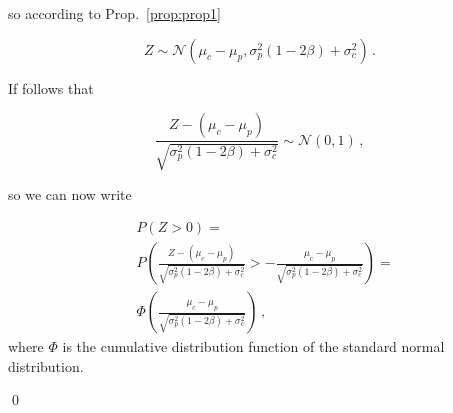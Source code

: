 \documentclass[final,10pt,5p,twocolumn,authoryear]{elsarticle}
\newcommand{\pref}[1]{Prop.~\ref{prop:#1}}
\newcommand{\be}{\begin{equation}}
\newcommand{\ee}{\end{equation}}
\numberwithin{equation}{section}
\begin{document}
so according to \pref{prop1}

\be
Z \sim \mathcal{N}\left(\mu_c - \mu_p,\sigma_p^2\left(1-2\beta\right) + \sigma_c^2\right)\,.
\ee

If follows that

\be
\frac{Z - \left(\mu_c - \mu_p\right)}{\sqrt{\sigma_p^2\left(1-2\beta\right) + \sigma_c^2}} \sim \mathcal{N}\left(0,1\right)\,,
\ee

so we can now write

\be
\begin{split}
&P\left(Z>0\right) = \\ & P\left(\frac{Z - (\mu_c - \mu_p)}{\sqrt{\sigma_p^2\left(1-2\beta\right) + \sigma_c^2}} > -\frac{\mu_c - \mu_p}{\sqrt{\sigma_p^2\left(1-2\beta\right) + \sigma_c^2}} \right) = \\ &\Phi\left(\frac{\mu_c - \mu_p}{\sqrt{\sigma_p^2\left(1 - 2\beta\right) + \sigma_c^2}}\right) \,,
\end{split}
\ee
where $\Phi$ is the cumulative distribution function of the standard normal distribution.

\qed
\end{document}
